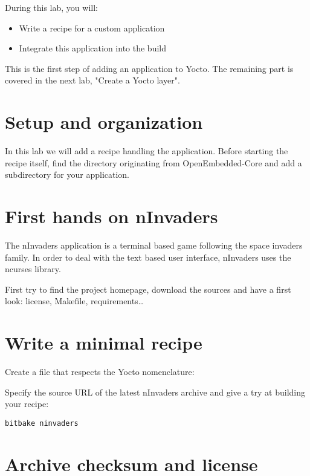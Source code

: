 
During this lab, you will:
\begin{itemize}
  \item Write a recipe for a custom application
  \item Integrate this application into the build
\end{itemize}

This is the first step of adding an application to Yocto. The
remaining part is covered in the next lab, "Create a Yocto layer".

\section{Setup and organization}

In this lab we will add a recipe handling the 
application. Before starting the recipe itself, find the
 directory originating from OpenEmbedded-Core and
add a subdirectory for your application.

\section{First hands on nInvaders}

The nInvaders application is a terminal based game following the space invaders
family. In order to deal with the text based user interface, nInvaders uses the
ncurses library.

First try to find the project homepage, download the sources and have a first
look: license, Makefile, requirements\dots

\section{Write a minimal recipe}

Create a file that respects the Yocto nomenclature: 

Specify the source URL of the latest nInvaders archive and give a try at
building your recipe:

\begin{verbatim}
bitbake ninvaders
\end{verbatim}

\section{Archive checksum and license}

